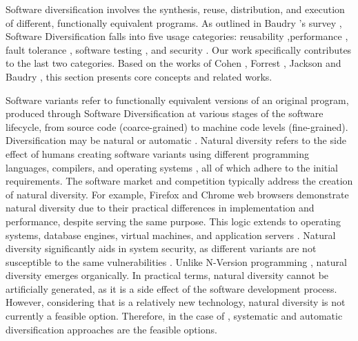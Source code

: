 

\label{sota:sw}

Software diversification involves the synthesis, reuse, distribution, and execution of different, functionally equivalent programs. 
As outlined in Baudry \etal's survey \cite{natural_diversity}, Software Diversification falls into five usage categories: reusability \cite{pohl2005software},performance \cite{10.1145/2025113.2025133}, fault tolerance \cite{1659219}, software testing \cite{Chen2010AdaptiveRT}, and security \cite{cohen1993operating}. 
Our work specifically contributes to the last two categories.
Based on the works of Cohen \etal \cite{cohen1993operating}, Forrest \etal \cite{595185}, Jackson \etal \cite{jackson} and Baudry \etal \cite{natural_diversity}, this section presents core concepts and related works. 



Software variants refer to functionally equivalent versions of an original program, produced through Software Diversification at various stages of the software lifecycle, from source code (coarce-grained) to machine code levels (fine-grained). 
Diversification may be natural \cite{natural_diversity} or automatic \cite{offensive_div}. 
Natural diversity refers to the side effect of humans creating software variants using different programming languages, compilers, and operating systems \cite{natural_diversity}, all of which adhere to the initial requirements. 
The software market and competition typically address the creation of natural diversity. 
For example, Firefox and Chrome web browsers demonstrate natural diversity due to their practical differences in implementation and performance, despite serving the same purpose. 
This logic extends to operating systems, database engines, virtual machines, and application servers \cite{natural_diversity}. 
Natural diversity significantly aids in system security, as different variants are not susceptible to the same vulnerabilities \cite{781031, 10.5555/1009382.1009753}. 
Unlike N-Version programming \cite{6312924}, natural diversity emerges organically. 
In practical terms, natural diversity cannot be artificially generated, as it is a side effect of the software development process. 
However, considering that \Wasm is a relatively new technology, natural diversity is not currently a feasible option. 
Therefore, in the case of \Wasm, systematic and automatic diversification approaches are the feasible options.



